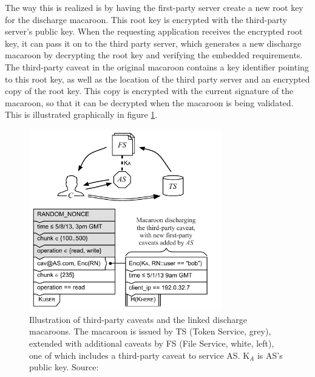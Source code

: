 The way this is realized is by having the first-party server create a new root key for the discharge macaroon. This root key is encrypted with the third-party server's public key. When the requesting application receives the encrypted root key, it can pass it on to the third party server, which generates a new discharge macaroon by decrypting the root key and verifying the embedded requirements. The third-party caveat in the original macaroon contains a key identifier pointing to this root key, as well as the location of the third party server and an encrypted copy of the root key. This copy is encrypted with the current signature of the macaroon, so that it can be decrypted when the macaroon is being validated.
This is illustrated graphically in figure \ref{fig:macaroon-third-party-caveats}.

\begin{figure}[H]
     \centering
     \includegraphics[width=0.75\textwidth]{images/macaroons/third-party-caveat.png}
     \caption{Illustration of third-party caveats and the linked discharge macaroons. The macaroon is issued by TS (Token Service, grey), extended with additional caveats by FS (File Service, white, left), one of which includes a third-party caveat to service AS. K$_A$ is AS's public key. Source: \citet{macaroons}}
     \label{fig:macaroon-third-party-caveats}
\end{figure}

